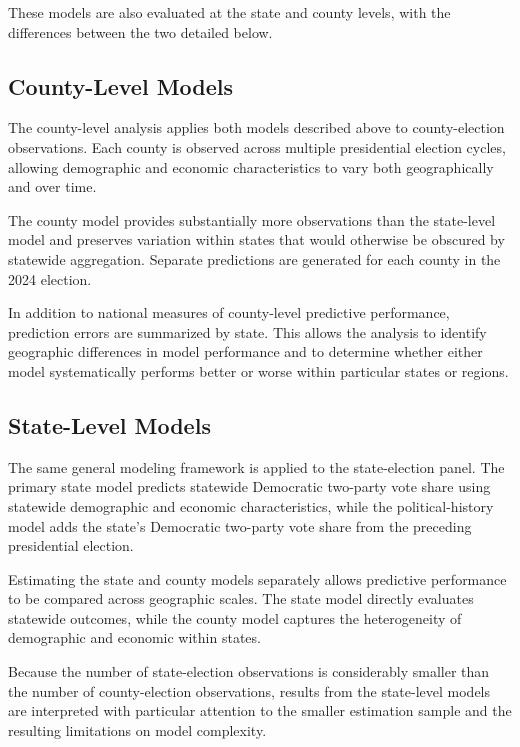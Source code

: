 \documentclass[12pt]{article}
\begin{document}
	These models are also evaluated at the state and county levels, with the differences between the two detailed below.
	
	
	\subsection{County-Level Models}
	
	The county-level analysis applies both models described above to county-election
	observations. Each county is observed across multiple presidential
	election cycles, allowing demographic and economic characteristics to
	vary both geographically and over time.
	
	The county model provides substantially more observations than the
	state-level model and preserves variation within states that would
	otherwise be obscured by statewide aggregation. Separate predictions
	are generated for each county in the 2024 election.
	
	In addition to national measures of county-level predictive performance,
	prediction errors are summarized by state. This allows the analysis to
	identify geographic differences in model performance and to determine
	whether either model systematically performs better or worse
	within particular states or regions.
	
	
	\subsection{State-Level Models}
	
	The same general modeling framework is applied to the
	state-election panel. The primary state model predicts statewide
	Democratic two-party vote share using statewide demographic and economic
	characteristics, while the political-history model
	adds the state's Democratic two-party vote share from the preceding
	presidential election.
	
	Estimating the state and county models separately allows predictive
	performance to be compared across geographic scales. The state model
	directly evaluates statewide outcomes, while the county model captures
	the heterogeneity of demographic and economic within states.
	
	Because the number of state-election observations is considerably
	smaller than the number of county-election observations, results from
	the state-level models are interpreted with particular attention to the
	smaller estimation sample and the resulting limitations on model
	complexity.
	
\end{document}
